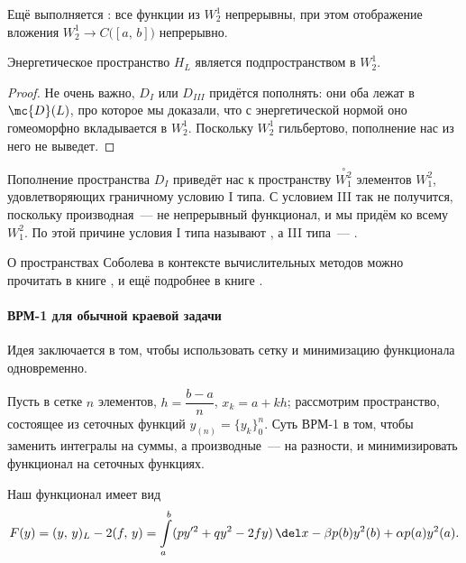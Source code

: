 \documentclass{trlnotes}
\begin{document}
    \begin{rem}
        Ещё выполняется : все функции из $W_2^1$ непрерывны, при этом отображение вложения $W_2^1 \to C\big([a, \, b]\big)$ непрерывно.
    \end{rem}

    \begin{st}
        Энергетическое пространство $H_{L}$ является подпространством в $W_2^1$.
        \begin{proof}
            Не очень важно, $D_{I}$ или $D_{III}$ придётся пополнять: они оба лежат в $\mc{D}(L)$, про которое мы доказали, что с энергетической нормой оно гомеоморфно вкладывается в $W_2^1$. Поскольку $W_2^1$ гильбертово, пополнение нас из него не выведет.
        \end{proof}
    \end{st}

    \begin{rem}
        Пополнение пространства $D_I$ приведёт нас к пространству $\overset{\circ}{W_1^2}$ элементов $W_1^2$, удовлетворяющих граничному условию I типа. С условием III так не получится, поскольку
        производная~--- не непрерывный функционал, и мы придём ко всему $W_1^2$.
        По этой причине условия I типа называют , а III типа~--- .
    \end{rem}

    О пространствах Соболева в контексте вычислительных методов можно прочитать в книге \cite{lebedev}, и ещё подробнее в книге \cite{atkinson}.

    \paragraph{ВРМ-1 для обычной краевой задачи}

    Идея  заключается в том, чтобы использовать сетку и минимизацию функционала одновременно. 

    Пусть в сетке $n$ элементов, $h = \dfrac{b - a}{n}$, $x_k = a + k h$; рассмотрим пространство, состоящее из сеточных функций $y_{(n)} = \{y_k\}_0^n$. Суть ВРМ-1 в том, чтобы заменить интегралы на суммы, а производные~--- на разности, и минимизировать функционал на сеточных функциях.

    Наш функционал имеет вид
    \[
        F(y) = (y, \, y)_L - 2(f, \, y) = \int\limits_a^b (py'^2 + qy^2 - 2fy) \, \del x - \beta p(b)y^2(b) + \alpha p(a)y^2(a). 
    \]
\end{document}
